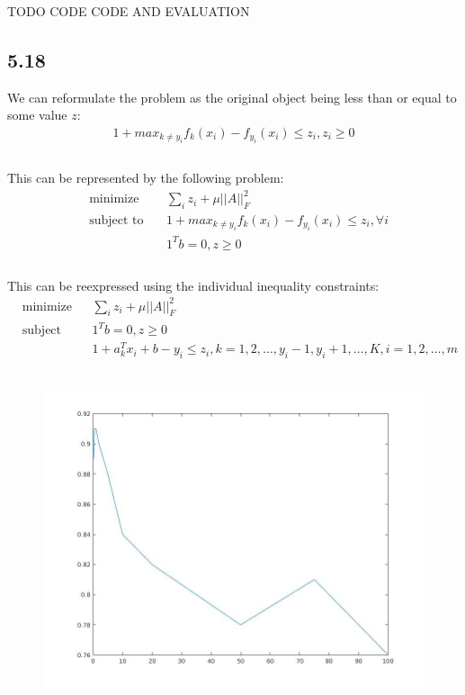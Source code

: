 \documentclass[12pt]{article}
\begin{document}
TODO CODE CODE AND EVALUATION

\subsection*{5.18}
We can reformulate the problem as the original object being less than or equal to some value $z$:
\begin{equation*}
\begin{aligned}
1+max_{k\neq y_i} f_k(x_i)  - f_{y_i} (x_i) \leq z_i,  z_i\geq 0\\
\end{aligned}
\end{equation*}\\
This can be represented by the following problem:
\begin{equation*}
\begin{aligned}
& \underset{}{\text{minimize}}
& &  \sum_i z_i + \mu ||A||_F^2\\
& \text{subject to}\
& & 1+max_{k\neq y_i} f_k(x_i) - f_{y_i} (x_i) \leq z_i, \forall i\\
&&&  1^T b= 0,   z \geq 0\\
\end{aligned}
\end{equation*}\\
This can be reexpressed using the individual inequality constraints:
\begin{equation*}
\begin{aligned}
& \underset{}{\text{minimize}}
& &  \sum_i z_i + \mu ||A||_F^2\\
& \text{subject to}\
& &  1^T b= 0,   z \geq 0\\
&&&  1+a_k^Tx_i + b  - y_i \leq z_i,    k = 1, 2, …,  y_i -1, y_i +1, …, K, i=1, 2, …, m
\end{aligned}
\end{equation*}\\
\begin{figure}[h]
\includegraphics[scale=.25]{Problem_5_18.jpg}
\end{figure}
\end{document}
